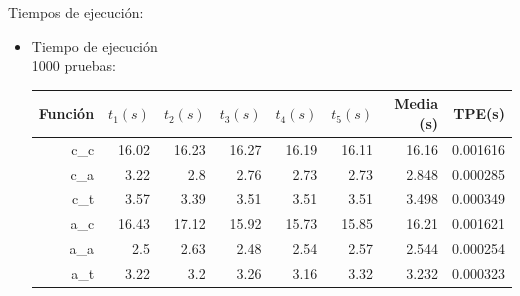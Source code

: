 \documentclass[12pt,letterpaper]{article}
\begin{document}
Tiempos de ejecución:
\begin{itemize}
\item {\large Tiempo de ejecución}\\
  1000 pruebas:
  \begin{center}
    \begin{tabular}{ r | r | r | r | r | r | r | r }
      Función & $t_1 (s)$ & $t_2 (s)$ & $t_3 (s)$ & $t_4 (s)$ & $t_5 (s)$ & Media (s) & TPE\footnotemark[1] (s) \\ \hline
      c\_c    & 16.02 & 16.23 & 16.27 & 16.19 & 16.11 & 16.16 & 0.001616 \\
      c\_a    & 3.22  & 2.8   & 2.76  & 2.73  & 2.73  & 2.848 & 0.000285 \\
      c\_t    & 3.57  & 3.39  & 3.51  & 3.51  & 3.51  & 3.498 & 0.000349 \\ \hline
      a\_c    & 16.43 & 17.12 & 15.92 & 15.73 & 15.85 & 16.21 & 0.001621 \\
      a\_a    & 2.5   & 2.63  & 2.48  & 2.54  & 2.57  & 2.544 & 0.000254 \\
      a\_t    & 3.22  & 3.2   & 3.26  & 3.16  & 3.32  & 3.232 & 0.000323 \\ \hline
    \end{tabular}
  \end{center}


\end{itemize}
\end{document}
